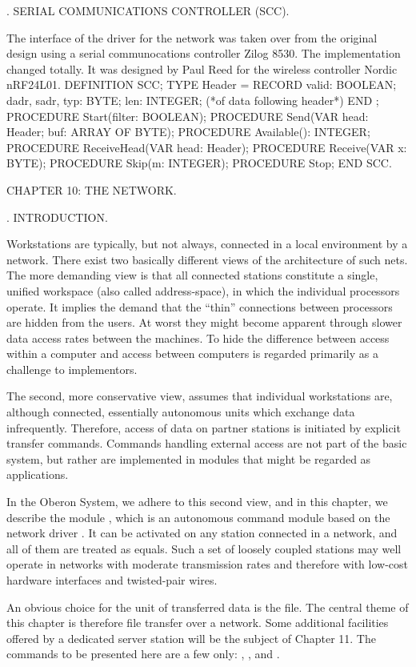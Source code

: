 . SERIAL COMMUNICATIONS CONTROLLER (SCC).

The interface of the driver for the network was taken over from the original design using a serial communocations controller Zilog 8530. The implementation changed totally. It was designed by Paul Reed for the wireless controller Nordic nRF24L01.
\begintt
DEFINITION SCC;
TYPE Header =
RECORD valid: BOOLEAN; dadr, sadr, typ: BYTE;
len: INTEGER; (*of data following header*) END ;
PROCEDURE Start(filter: BOOLEAN);
PROCEDURE Send(VAR head: Header; buf: ARRAY OF BYTE); PROCEDURE Available(): INTEGER;
PROCEDURE ReceiveHead(VAR head: Header);
PROCEDURE Receive(VAR x: BYTE);
PROCEDURE Skip(m: INTEGER);
PROCEDURE Stop;
END SCC.
\endtt

\beginchapter CHAPTER 10: THE NETWORK.

. INTRODUCTION.

Workstations are typically, but not always, connected in a local environment by a network. There exist two basically different views of the architecture of such nets. The more demanding view is that all connected stations constitute a single, unified workspace (also called address-space), in which the individual processors operate. It implies the demand that the ``thin'' connections between processors are hidden from the users. At worst they might become apparent through slower data access rates between the machines. To hide the difference between access within a computer and access between computers is regarded primarily as a challenge to implementors.

The second, more conservative view, assumes that individual workstations are, although connected, essentially autonomous units which exchange data infrequently. Therefore, access of data on partner stations is initiated by explicit transfer commands. Commands handling external access are not part of the basic system, but rather are implemented in modules that might be regarded as applications.

In the Oberon System, we adhere to this second view, and in this chapter, we describe the module , which is an autonomous command module based on the network driver . It can be activated on any station connected in a network, and all of them are treated as equals. Such a set of loosely coupled stations may well operate in networks with moderate transmission rates and therefore with low-cost hardware interfaces and twisted-pair wires.

An obvious choice for the unit of transferred data is the file. The central theme of this chapter is therefore file transfer over a network. Some additional facilities offered by a dedicated server station will be the subject of Chapter 11. The commands to be presented here are a few only: , , and .

